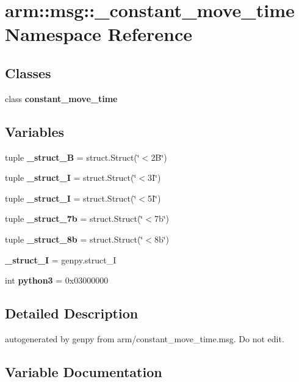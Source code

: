 \section{arm\-:\-:msg\-:\-:\-\_\-constant\-\_\-move\-\_\-time \-Namespace \-Reference}
\label{namespacearm_1_1msg_1_1__constant__move__time}
\subsection*{\-Classes}
\begin{DoxyCompactItemize}
\item 
class {\bf constant\-\_\-move\-\_\-time}
\end{DoxyCompactItemize}
\subsection*{\-Variables}
\begin{DoxyCompactItemize}
\item 
tuple {\bf \-\_\-struct\-\_\-B} = struct.\-Struct(\char`\"{}$<$2\-B\char`\"{})
\item 
tuple {\bf \-\_\-struct\-\_\-I} = struct.\-Struct(\char`\"{}$<$3\-I\char`\"{})
\item 
tuple {\bf \-\_\-struct\-\_\-I} = struct.\-Struct(\char`\"{}$<$5\-I\char`\"{})
\item 
tuple {\bf \-\_\-struct\-\_\-7b} = struct.\-Struct(\char`\"{}$<$7b\char`\"{})
\item 
tuple {\bf \-\_\-struct\-\_\-8b} = struct.\-Struct(\char`\"{}$<$8b\char`\"{})
\item 
{\bf \-\_\-struct\-\_\-\-I} = genpy.\-struct\-\_\-\-I
\item 
int {\bf python3} = 0x03000000
\end{DoxyCompactItemize}


\subsection{\-Detailed \-Description}
\begin{DoxyVerb}autogenerated by genpy from arm/constant_move_time.msg. Do not edit.\end{DoxyVerb}
 

\subsection{\-Variable \-Documentation}
